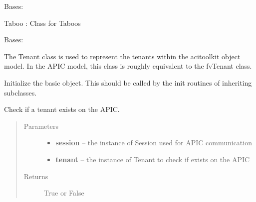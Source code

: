 \documentclass[letterpaper,10pt,english]{sphinxmanual}
\begin{document}

\begin{fulllineitems}
\label{acitoolkit:acitoolkit.Taboo}
Bases: {\hyperref[acitoolkit:acitoolkit.BaseContract]{}}

Taboo :  Class for Taboos

\end{fulllineitems}


\begin{fulllineitems}
\label{acitoolkit:acitoolkit.Tenant}
Bases: {\hyperref[acibaseobject:acibaseobject.BaseACIObject]{}}

The Tenant class is used to represent the tenants within the acitoolkit
object model.  In the APIC model, this class is roughly equivalent to
the fvTenant class.

Initialize the basic object.  This should be called by the
init routines of inheriting subclasses.

\begin{fulllineitems}
\label{acitoolkit:acitoolkit.Tenant.exists}
Check if a tenant exists on the APIC.
\begin{quote}\begin{description}
\item[{Parameters}] \leavevmode\begin{itemize}
\item {} 
\textbf{session} -- the instance of Session used for APIC communication

\item {} 
\textbf{tenant} -- the instance of Tenant to check if exists on the APIC

\end{itemize}

\item[{Returns}] \leavevmode
True or False

\end{description}\end{quote}


\end{fulllineitems}
\end{fulllineitems}
\end{document}
